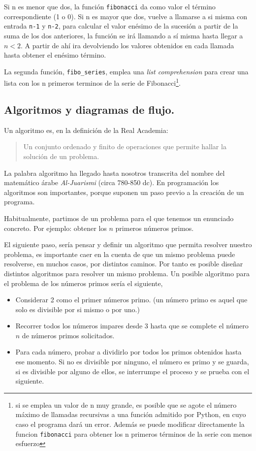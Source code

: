 \begin{paracol}{2}
Si n es menor que dos, la función \texttt{fibonacci} da como valor el término correspondiente (1 o 0). Si n es mayor que dos, vuelve a llamarse a si misma con entrada \texttt{n-1} y \texttt{n-2}, para calcular el valor enésimo de la sucesión a partir de la suma de los dos anteriores, la función se irá llamando a sí misma hasta  llegar a $n<2$. A partir de ahí ira devolviendo los valores obtenidos en cada llamada hasta obtener el enésimo término.

La segunda función, \texttt{fibo_series}, emplea una \emph{list comprehension} para crear una lista con los n primeros terminos de la serie de Fibonacci\footnote{si se emplea un valor de n muy grande, es posible que se agote el número máximo de llamadas recursivas a una función admitido por Python, en cuyo caso el programa dará un error. Además se puede modificar directamente la funcion \texttt{fibonacci} para obtener los n primeros términos de la serie con menos esfuerzo}.

\subsection{Algoritmos y diagramas de flujo.} 
Un algoritmo es, en la definición de la Real Academia: 
\begin{quotation}
Un conjunto ordenado y finito de operaciones que permite hallar la solución de un problema.
\end{quotation}

La palabra algoritmo ha llegado hasta nosotros transcrita del nombre del matemático árabe \emph{Al-Juarismi} (circa 780-850 dc). En programación los algoritmos son importantes, porque suponen un paso previo a la creación de un programa.

Habitualmente, partimos de un problema para el que tenemos un enunciado concreto. Por ejemplo: obtener los $n$ primeros números primos. 

El siguiente paso, sería pensar y definir un algoritmo que permita resolver nuestro problema, es importante caer en la cuenta de que un mismo problema puede resolverse, en muchos casos, por distintos caminos. Por tanto es posible diseñar distintos algoritmos para resolver un mismo problema. Un posible algoritmo para el problema de los números primos sería el siguiente,

\begin{itemize}
\item Considerar 2 como el primer números primo. (un número primo es aquel que solo es divisible por si mismo o por uno.)
\item Recorrer todos los números impares desde 3 hasta que se complete el número $n$ de números primos solicitados.
\item Para cada número, probar a dividirlo por todos los primos obtenidos hasta ese momento. Si no es divisible por ninguno, el número es primo y se guarda, si es divisible por alguno de ellos, se interrumpe el proceso y se prueba con el siguiente.
\end{itemize}


\end{paracol}
